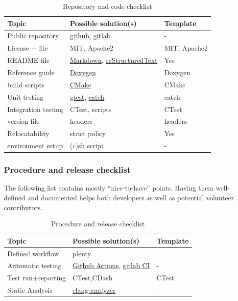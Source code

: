 \documentclass[12pt,a4paper]{article}
\begin{document}
\begin{table}[H]
  \caption{Repository and code checklist}
  \label{tab:repository-and-code-checklist}
  \begin{tabular}{lll}
  \toprule
  \textbf{Topic} & \textbf{Possible solution(s)} & \textbf{Template} \\
  \midrule
Public repository & \href{https://github.com}{github},
\href{https://gitlab.com}{gitlab} & - \\
License + file & MIT, Apache2 & MIT, Apache2 \\
README file & \href{https://en.wikipedia.org/wiki/Markdown}{Markdown},
\href{http://docutils.sourceforge.net/rst.html}{reStructuredText} &
Yes \\
Reference guide & \href{http://www.doxygen.org}{Doxygen} & Doxygen \\
build scripts & \href{https://www.cmake.org}{CMake} & CMake \\
Unit testing & \href{https://github.com/google/googletest}{gtest},
\href{https://github.com/philsquared/Catch}{catch} & catch \\
Integration testing & CTest, scripts & CTest \\
version file & headers & headers \\
Relocatability & strict policy & Yes \\
environment setup & (c)sh script & - \\
\end{tabular}
\end{table}

\subsubsection{Procedure and release checklist}\label{procedure-and-release-checklist}

The following list contains mostly ``nice-to-have'' points. Having them
well-defined and documented helps both developers as well as potential
volunteer contributors.

\begin{table}[H]
  \caption{Procedure and release checklist}
  \label{tab:procedure-and-release-checklist}
  \begin{tabular}{lll}
  \toprule
  \textbf{Topic} & \textbf{Possible solution(s)} & \textbf{Template} \\
  \midrule
Defined workflow & plenty & \\
Automatic testing & \href{https://docs.github.com/en/actions}{Github Actions},
\href{https://about.gitlab.com/solutions/continuous-integration/}{gitlab CI} & - \\
Test run+reporting & CTest,CDash & CTest \\
Static Analysis &
\href{http://clang-analyzer.llvm.org}{clang-analyzer} & - \\
  \end{tabular}
\end{table}
\end{document}
